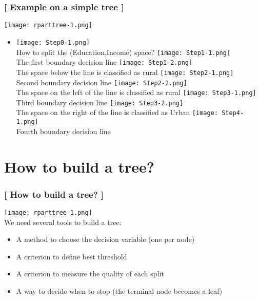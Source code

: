 \documentclass[xcolor=x11names,compress]{beamer}
\renewcommand{\(}{\begin{columns}}
\renewcommand{\)}{\end{columns}}
\newcommand{\<}[1]{\begin{column}{#1}}
\renewcommand{\>}{\end{column}}
\begin{document}
\begin{frame} %
\frametitle{\textcolor{brique}{[ Example on a simple tree ]}}
\hfill \texttt{[image: rparttree-1.png]}
\begin{itemize}
\item[]
    {\texttt{[image: Step0-1.png]} \\ }
    {How to split the (Education,Income) space?}
    {\texttt{[image: Step1-1.png]} \\ }
    {The first boundary decision line}
    { \texttt{[image: Step1-2.png]} \\ }
    {The space below the line is classified as  rural}
    {\texttt{[image: Step2-1.png]} \\ }
    {Second boundary decision line}
    {\texttt{[image: Step2-2.png]} \\ }
    {The space on the left of the line is classified as  rural}
    {\texttt{[image: Step3-1.png]} \\ }
    {Third boundary decision line}
    {\texttt{[image: Step3-2.png]} \\ }
    {The space on the right of the line is classified as  Urban}
    {\texttt{[image: Step4-1.png]} \\ }
    {Fourth boundary decision line}
\end{itemize}
\end{frame}

\section{How to build a tree?}

\begin{frame}
\frametitle{\textcolor{brique}{[ How to build a tree? ]}}
 \hfill \texttt{[image: rparttree-1.png]} \\

We need several tools to build a tree:
\pause
\begin{itemize}[<+->]
    \item  A method to choose the decision variable (one per node)
    \item  A criterion to define best threshold
    \item  A criterion to measure the quality of each split
    \item  A way to decide when to stop (the terminal node becomes a leaf)
\end{itemize}
\end{frame}
\end{document}
